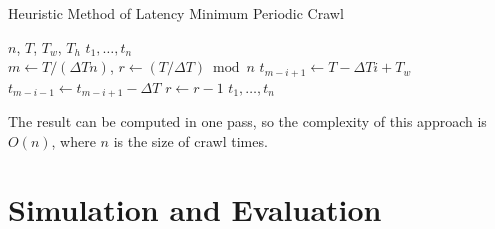 \documentclass[conference]{IEEEtran}
\begin{document}
\begin{algorithm}
\caption{Heuristic Method of Latency Minimum Periodic Crawl}
  \begin{algorithmic}[1]
  \renewcommand{\algorithmicrequire}{\textbf{Input:}}
  \renewcommand{\algorithmicensure}{\textbf{Output:}}
  \REQUIRE $n$, $T$, $T_w$, $T_h$
  \ENSURE  $t_1,\ldots,t_n$
  \\ 
  \STATE $m \gets T/(\Delta T n)$, $r\gets (T/\Delta T)\bmod{n}$
    \STATE $t_{m-i+1}\gets T-\Delta T i + T_w$
    	\STATE $t_{m-i-1}\gets t_{m-i+1}-\Delta T$
        \STATE $r\gets r-1$
    \ENDIF
  \ENDFOR
  \RETURN $t_1,\ldots,t_n$
  \end{algorithmic} 
\end{algorithm}

The result can be computed in one pass, so the complexity of this approach is $O(n)$, where $n$ is the size of crawl times.

\section{Simulation and Evaluation} \label{simulation}
\end{document}
